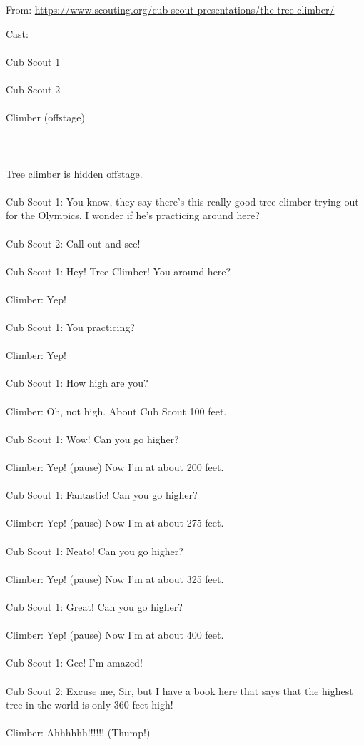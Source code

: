 
From: \url{https://www.scouting.org/cub-scout-presentations/the-tree-climber/}

Cast:\\
\\
Cub Scout 1\\
\\
Cub Scout 2\\
\\
Climber (offstage)\\
\\
 \\
\\
Tree climber is hidden offstage.\\
\\
Cub Scout 1: You know, they say there’s this really good tree climber trying out for the Olympics. I wonder if he’s practicing around here?\\
\\
Cub Scout 2: Call out and see!\\
\\
Cub Scout 1: Hey! Tree Climber! You around here?\\
\\
Climber: Yep!\\
\\
Cub Scout 1: You practicing?\\
\\
Climber: Yep!\\
\\
Cub Scout 1: How high are you?\\
\\
Climber: Oh, not high. About Cub Scout 100 feet.\\
\\
Cub Scout 1: Wow! Can you go higher?\\
\\
Climber: Yep! (pause) Now I’m at about 200 feet.\\
\\
Cub Scout 1: Fantastic! Can you go higher?\\
\\
Climber: Yep! (pause) Now I’m at about 275 feet.\\
\\
Cub Scout 1: Neato! Can you go higher?\\
\\
Climber: Yep! (pause) Now I’m at about 325 feet.\\
\\
Cub Scout 1: Great! Can you go higher?\\
\\
Climber: Yep! (pause) Now I’m at about 400 feet.\\
\\
Cub Scout 1: Gee! I’m amazed!\\
\\
Cub Scout 2: Excuse me, Sir, but I have a book here that says that the highest tree in the world is only 360 feet high!\\
\\
Climber: Ahhhhhh!!!!!! (Thump!)\\
